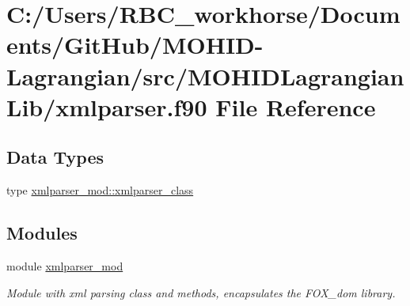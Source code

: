 \hypertarget{xmlparser_8f90}{}\section{C\+:/\+Users/\+R\+B\+C\+\_\+workhorse/\+Documents/\+Git\+Hub/\+M\+O\+H\+I\+D-\/\+Lagrangian/src/\+M\+O\+H\+I\+D\+Lagrangian\+Lib/xmlparser.f90 File Reference}
\label{xmlparser_8f90}
\subsection*{Data Types}
\begin{DoxyCompactItemize}
\item 
type \mbox{\hyperlink{structxmlparser__mod_1_1xmlparser__class}{xmlparser\+\_\+mod\+::xmlparser\+\_\+class}}
\end{DoxyCompactItemize}
\subsection*{Modules}
\begin{DoxyCompactItemize}
\item 
module \mbox{\hyperlink{namespacexmlparser__mod}{xmlparser\+\_\+mod}}
\begin{DoxyCompactList}\small\item\em Module with xml parsing class and methods, encapsulates the F\+O\+X\+\_\+dom library. \end{DoxyCompactList}\end{DoxyCompactItemize}
